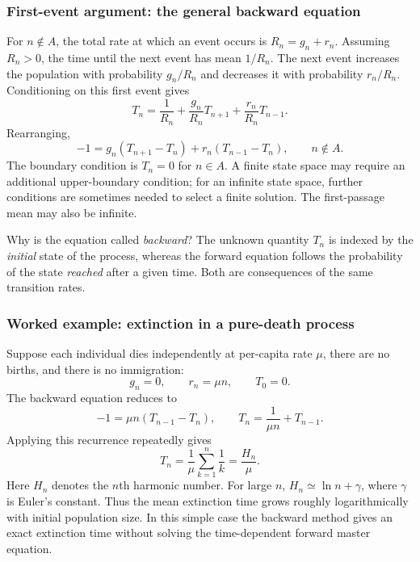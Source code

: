\subsubsection{First-event argument: the general backward equation}
For $n\notin A$, the total rate at which an event occurs is
$R_n=g_n+r_n$. Assuming $R_n>0$, the time until the next event has
mean $1/R_n$. The next event increases the population with probability
$g_n/R_n$ and decreases it with probability $r_n/R_n$.
Conditioning on this first event gives
\begin{equation}
 T_n=\frac{1}{R_n}
   +\frac{g_n}{R_n}T_{n+1}
   +\frac{r_n}{R_n}T_{n-1}.
 \label{eq:ext-first-step}
\end{equation}
Rearranging,
\begin{equation}
 \boxed{-1=g_n(T_{n+1}-T_n)+r_n(T_{n-1}-T_n),
       \qquad n\notin A.}
 \label{eq:ext-backward-equation}
\end{equation}
The boundary condition is $T_n=0$ for $n\in A$. A finite state space may
require an additional upper-boundary condition; for an infinite state
space, further conditions are sometimes needed to select a finite
solution. The first-passage mean may also be infinite.

Why is the equation called \emph{backward}? The unknown quantity $T_n$
is indexed by the \emph{initial} state of the process, whereas the
forward equation follows the probability of the state \emph{reached}
after a given time. Both are consequences of the same transition rates.

\subsubsection{Worked example: extinction in a pure-death process}
Suppose each individual dies independently at per-capita rate $\mu$,
there are no births, and there is no immigration:
\begin{equation}
 g_n=0,\qquad r_n=\mu n,\qquad T_0=0.
 \label{eq:ext-pure-death}
\end{equation}
The backward equation reduces to
\begin{equation}
 -1=\mu n(T_{n-1}-T_n),\qquad
 T_n=\frac{1}{\mu n}+T_{n-1}.
 \label{eq:ext-pure-death-step}
\end{equation}
Applying this recurrence repeatedly gives
\begin{equation}
 \boxed{T_n=\frac{1}{\mu}\sum_{k=1}^n\frac{1}{k}
             =\frac{H_n}{\mu}.}
 \label{eq:ext-pure-death-result}
\end{equation}
Here $H_n$ denotes the $n$th harmonic number. For large $n$,
$H_n\simeq\ln n+\gamma$, where $\gamma$ is Euler's constant. Thus the
mean extinction time grows roughly logarithmically with initial
population size. In this simple case the backward method gives an
exact extinction time without solving the time-dependent forward
master equation.

